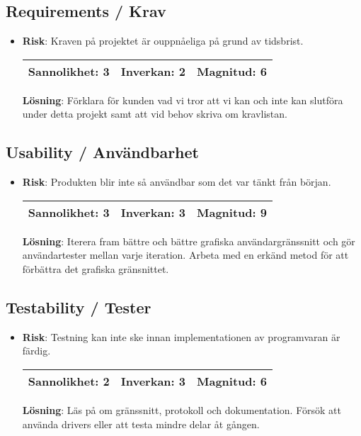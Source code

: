 \subsection{Requirements / Krav}
\begin{itemize}
\item \textbf{Risk}: Kraven på projektet är ouppnåeliga på grund av tidsbrist.

\begin{tabular}{ | l | l | l |}
	\hline
	Sannolikhet: 3 & Inverkan: 2 & Magnitud: 6 \\ \hline
\end{tabular}

\textbf{Lösning}: Förklara för kunden vad vi tror att vi kan och inte kan slutföra under detta projekt samt att vid behov skriva om kravlistan.
\end{itemize}

\subsection{Usability / Användbarhet}
\begin{itemize}
\item \textbf{Risk}: Produkten blir inte så användbar som det var tänkt från början.

\begin{tabular}{ | l | l | l |}
	\hline
	Sannolikhet: 3 & Inverkan: 3 & Magnitud: 9 \\ \hline
\end{tabular}

\textbf{Lösning}: Iterera fram bättre och bättre grafiska användargränssnitt och gör användartester mellan varje iteration. Arbeta med en erkänd metod för att förbättra det grafiska gränsnittet.
\end{itemize}

\subsection{Testability / Tester}
\begin{itemize}
\item \textbf{Risk}: Testning kan inte ske innan implementationen av programvaran är färdig.

\begin{tabular}{ | l | l | l |}
	\hline
	Sannolikhet: 2 & Inverkan: 3 & Magnitud: 6 \\ \hline
\end{tabular}

\textbf{Lösning}: Läs på om gränssnitt, protokoll och dokumentation. Försök att använda drivers eller att testa mindre delar åt gången.
\end{itemize}

